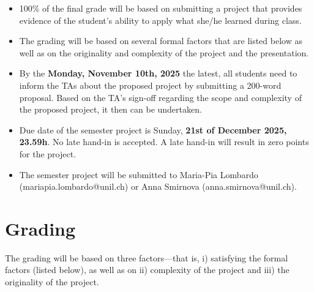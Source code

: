 \documentclass[12pt]{article} %
\begin{document}
\begin{itemize}

 \item 100\% of the final grade will be based on submitting a project that 
provides evidence of the student's ability to apply what she/he learned 
during class.

\item The grading will be based on several formal factors that are listed 
below as well as on the originality and complexity of the project and the presentation.



\item By the {\bf{Monday, November 10th, 2025}} the latest, all students need to inform the TAs about
the proposed project by submitting a 200-word proposal. 
Based on the TA's sign-off regarding the scope and complexity
of the proposed project, it then can be undertaken.

\item Due date of the semester project is Sunday, {\bf{21st of December 2025, 23.59h}}.
No late hand-in is accepted.
A late hand-in will result in zero points for the project.

\item The semester project will be submitted to Maria-Pia Lombardo (mariapia.lombardo@unil.ch) or Anna Smirnova (anna.smirnova@unil.ch).

\end{itemize}









\section{Grading}



The grading will be based on three factors---that is, 
i) satisfying the formal factors (listed below), as well as on ii) complexity of 
the project and iii) the originality of the project.
\end{document}
